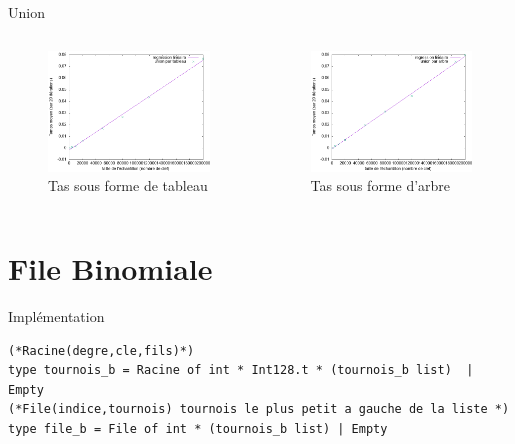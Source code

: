 \documentclass[11pt]{beamer}
\begin{document}
\begin{frame}{Union}

\begin{columns}[t]
  \begin{column}{5cm}
  
\begin{figure}[hbtp]
\centering
\includegraphics[width=5cm]{../Images/svg courbes pour rapport/cplxt_union_tab_regression.png}
\caption{Tas sous forme de tableau}
\label{fig1}
\end{figure}


  \end{column}
  
  \begin{column}{5cm}
  
\begin{figure}[hbtp]
\centering
\includegraphics[width=5cm]{../Images/svg courbes pour rapport/cplxt_union_arbre_regression.png}
\caption{Tas sous forme d'arbre}
\label{fig2}
\end{figure}
  
  
  \end{column}
 \end{columns}  



\end{frame}

\section{File Binomiale}

\begin{frame}[fragile]{Implémentation}

\bigskip \begin{lstlisting}
(*Racine(degre,cle,fils)*)
type tournois_b = Racine of int * Int128.t * (tournois_b list)  | Empty 
(*File(indice,tournois) tournois le plus petit a gauche de la liste *) 
type file_b = File of int * (tournois_b list) | Empty 
\end{lstlisting} \bigskip

\end{frame}
\end{document}
